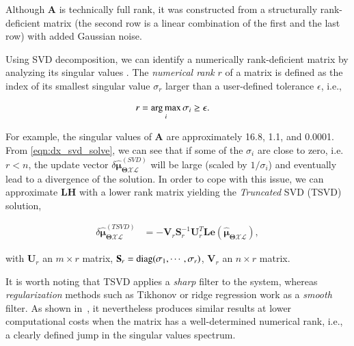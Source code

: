 \noindent Although $\mathbf{A}$ is technically full rank, it was constructed
from a structurally rank-deficient matrix (the second row is a linear
combination of the first and the last row) with added Gaussian noise. 

Using SVD decomposition, we can identify a numerically rank-deficient matrix by
analyzing its singular values \cite{hansen98rank}. The \emph{numerical rank}
$r$ of a matrix is defined as the index of its smallest singular value
$\sigma_r$ larger than a user-defined tolerance $\epsilon$, i.e.,

\begin{equation}\label{eqn:numerical_rank}
  \begin{aligned}
  r &= \operatorname*{arg\,max}_i \sigma_i\geq\epsilon.
  \end{aligned}
\end{equation}

For example, the singular values of $\mathbf{A}$ are approximately 16.8, 1.1,
and 0.0001. From \eqref{eqn:dx_svd_solve}, we can see that if some of the
$\sigma_i$ are close to zero, i.e. $r<n$, the update vector
$\delta\hat{\boldsymbol{\mu}}_{\boldsymbol{\Theta}\mathcal{X}\mathcal{L}}^
{(SVD)}$ will be large (scaled by $1/\sigma_i$) and eventually lead to a
divergence of the solution. In order to cope with this issue, we can
approximate $\mathbf{L}\mathbf{H}$ with a lower rank matrix yielding the
\emph{Truncated} SVD (TSVD)~\cite{varah73numerical} solution,

\begin{equation}\label{eqn:dx_tsvd_solve}
  \begin{aligned}
  \delta\hat{\boldsymbol{\mu}}_{\boldsymbol{\Theta}\mathcal{X}\mathcal{L}}^
    {(TSVD)} &=
    -\mathbf{V}_r\mathbf{S}_r^{-1}\mathbf{U}_r^T
    \mathbf{L}\mathbf{e}(
    \mathbf{\hat{\boldsymbol{\mu}}_{
    \boldsymbol{\Theta}\mathcal{X}\mathcal{L}}}),
  \end{aligned}
\end{equation}

\noindent with $\mathbf{U}_r$ an $m\times r$ matrix,
$\mathbf{S}_r=\operatorname{diag}(\sigma_1, \cdots,\sigma_r)$, $\mathbf{V}_r$ an $n\times r$
matrix.

It is worth noting that TSVD applies a \emph{sharp} filter to the system,
whereas \emph{regularization} methods such as Tikhonov or ridge regression work
as a \emph{smooth} filter. As shown in~\cite{hansen87truncated}, it nevertheless
produces similar results at lower computational costs when the matrix has a
well-determined numerical rank, i.e., a clearly defined jump in the singular
values spectrum.

